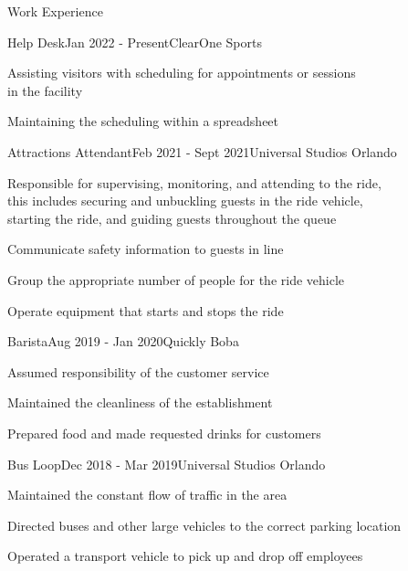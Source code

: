 \documentclass{resume} %
\begin{document}
\begin{rSection}{Work Experience}
	\begin{rSubsection}{Help Desk}{Jan 2022 - Present}{ClearOne Sports}{}
	\item Assisting visitors with scheduling for appointments or sessions \\in the facility
	\item Maintaining the scheduling within a spreadsheet 
	\end{rSubsection}
	
    \begin{rSubsection}{Attractions Attendant}{Feb 2021 - Sept 2021}{Universal Studios Orlando}{}
        \item Responsible for supervising, monitoring, and attending to the ride,\\ this includes securing and unbuckling guests in the ride vehicle,\\ starting the ride, and guiding guests throughout the queue
        \item Communicate safety information to guests in line
        \item Group the appropriate number of people for the ride vehicle
        \item Operate equipment that starts and stops the ride
        
    \end{rSubsection}

    \begin{rSubsection}{Barista}{Aug 2019 - Jan 2020}{Quickly Boba}{}
        \item Assumed responsibility of the customer service
        \item Maintained the cleanliness of the establishment
        \item Prepared food and made requested drinks for customers
    \end{rSubsection}

	\begin{rSubsection}{Bus Loop}{Dec 2018 - Mar 2019}{Universal Studios Orlando}{}
		\item Maintained the constant flow of traffic in the area
        \item Directed buses and other large vehicles to the correct parking location
        \item Operated a transport vehicle to pick up and drop off employees
    \end{rSubsection}
    
\end{rSection}
\end{document}
